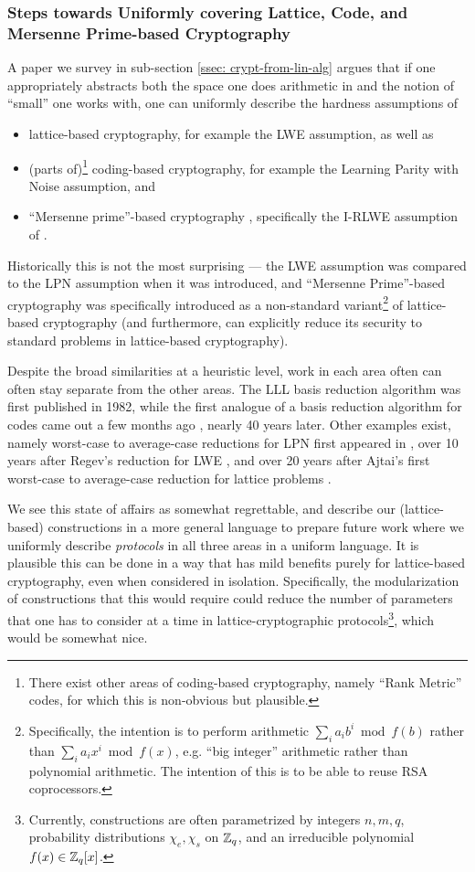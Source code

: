 \subsubsection{Steps towards Uniformly covering Lattice, Code, and Mersenne Prime-based Cryptography}
A paper \cite{cryptofromlinalg} we survey in sub-section \ref{ssec: crypt-from-lin-alg} argues that if one appropriately abstracts both the space one does arithmetic in and the notion of ``small'' one works with, one can uniformly describe the hardness assumptions of
\begin{itemize}
	\item lattice-based cryptography, for example the LWE assumption, as well as
	\item (parts of)\footnote{There exist other areas of coding-based cryptography, namely ``Rank Metric'' codes, for which this is non-obvious but plausible.} coding-based cryptography, for example the Learning Parity with Noise assumption, and
	\item ``Mersenne prime''-based cryptography \cite{C:AJPS18}, specifically the I-RLWE assumption of \cite{EPRINT:Chunsheng17b}.
\end{itemize}
Historically this is not the most surprising --- the LWE assumption was compared to the LPN assumption when it was introduced, and ``Mersenne Prime''-based cryptography was specifically introduced as a non-standard variant\footnote{Specifically, the intention is to perform arithmetic $\sum_i a_ib^i \bmod f(b)$ rather than $\sum_i a_i x^i \bmod f(x)$, e.g. ``big integer'' arithmetic rather than polynomial arithmetic.
The intention of this is to be able to reuse RSA coprocessors.} of lattice-based cryptography (and furthermore, can explicitly reduce its security to standard problems in lattice-based cryptography).

Despite the broad similarities at a heuristic level, work in each area often can often stay separate from the other areas.
The LLL basis reduction algorithm \cite{LLL} was first published in 1982, while the first analogue of a basis reduction algorithm for codes came out a few months ago \cite{AlgoRedCodes}, nearly 40 years later.
Other examples exist, namely worst-case to average-case reductions for LPN first appeared in \cite{EPRINT:BLVW18}, over 10 years after Regev's reduction for LWE \cite{STOC:Regev05}, and over 20 years after Ajtai's first worst-case to average-case reduction for lattice problems \cite{STOC:Ajtai96}.

We see this state of affairs as somewhat regrettable, and describe our (lattice-based) constructions in a more general language to prepare future work where we uniformly describe \emph{protocols} in all three areas in a uniform language.
It is plausible this can be done in a way that has mild benefits purely for lattice-based cryptography, even when considered in isolation.
Specifically, the modularization of constructions that this would require could reduce the number of parameters that one has to consider at a time in lattice-cryptographic protocols\footnote{Currently, constructions are often parametrized by integers $n, m, q$, probability distributions $\chi_e, \chi_s$ on $\mathbb{Z}_q$, and an irreducible polynomial$f(x)\in\mathbb{Z}_q[x]$.}, which would be somewhat nice.

